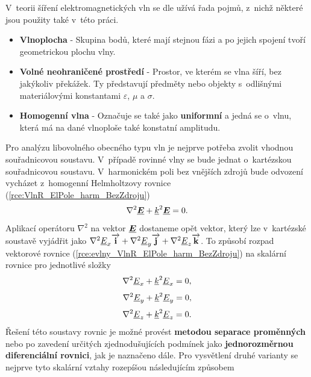 V~teorii šíření elektromagnetických vln se dle \cite{emp} užívá řada pojmů, z~nichž některé jsou použity také v~této práci.
\begin{itemize}
\item {\bf Vlnoplocha} - Skupina bodů, které mají stejnou fázi a po jejich spojení tvoří geometrickou plochu vlny.
\item {\bf Volné neohraničené prostředí} - Prostor, ve kterém se vlna šíří, bez jakýkoliv překážek. Ty představují předměty nebo objekty s~odlišnými materiálovými konstantami  $\varepsilon$, $\mu$ a $\sigma$.
\item {\bf Homogenní vlna} - Označuje se také jako {\bf uniformní} a jedná se o~vlnu, která má na dané vlnoploše také konstatní amplitudu.
\end{itemize}

Pro analýzu libovolného obecného typu vln je nejprve potřeba zvolit vhodnou souřadnicovou soustavu. V~případě rovinné vlny se bude jednat o~kartézskou souřadnicovou soustavu. V~harmonickém poli bez vnějších zdrojů bude odvození vycházet z~homogenní Helmholtzovy rovnice (\ref{rce:VlnR_ElPole_harm_BezZdroju})
\begin{equation}
	\nabla^{2}\mbox{\underline{\boldmath$E$}} + {\underline{k}}^{2}\mbox{\underline{\boldmath$E$}} = 0.
	\label{rce:evlny_VlnR_ElPole_harm_BezZdroju}
\end{equation}
Aplikací operátoru $\nabla^{2}$ na vektor $\mbox{\underline{\boldmath$E$}}$ dostaneme opět vektor, který lze v~kartézské soustavě vyjádřit jako $\nabla^{2}{\underline{E}}_{x}\overrightarrow{\mathrm{\textbf{i}}} + \nabla^{2} {\underline{E}}_{y}\overrightarrow{\mathrm{\textbf{j}}} + \nabla^{2}{\underline{E}}_{z}\overrightarrow{\mathrm{\textbf{k}}}$. To způsobí rozpad vektorové rovnice (\ref{rce:evlny_VlnR_ElPole_harm_BezZdroju}) na skalární rovnice pro jednotlivé složky
\begin{displaymath}
	\nabla^{2} {\underline{E}}_{x} +{\underline{k}}^{2} {\underline{E}}_{x} = 0,
\end{displaymath}
\begin{displaymath}
	\nabla^{2} {\underline{E}}_{y} +{\underline{k}}^{2} {\underline{E}}_{y} = 0,
\end{displaymath}
\begin{displaymath}
	\nabla^{2} {\underline{E}}_{z} +{\underline{k}}^{2} {\underline{E}}_{z} = 0.
\end{displaymath}
Řešení této soustavy rovnic je možné provést {\bf metodou separace proměnných} nebo po zavedení určitých zjednodušujících podmínek jako {\bf jednorozměrnou diferenciální rovnici}, jak je naznačeno dále. Pro vysvětlení druhé varianty se nejprve tyto skalární vztahy rozepíšou následujícím způsobem
